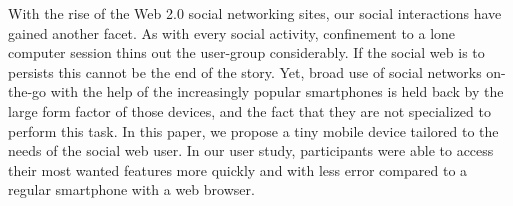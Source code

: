 With the rise of the Web 2.0 social networking sites, our social interactions
have gained another facet. As with every social activity, confinement
to a lone computer session thins out the user-group considerably.
If the social web is 
to persists this cannot be the end of the story. Yet, broad use of social networks on-the-go 
with the help of
the increasingly popular smartphones is held back by the large form factor of 
those devices, and the fact that they are not specialized to perform this 
task. In this paper, we propose a tiny mobile device tailored to the needs 
of the social web user. In our user study, participants were able to access
their most wanted features more quickly and with less error compared to a 
regular smartphone with a web browser.
